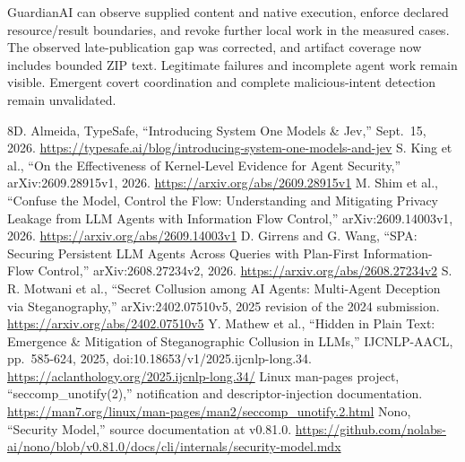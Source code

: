 \documentclass[conference]{IEEEtran}
\begin{document}
GuardianAI can observe supplied content and native execution, enforce declared resource/result boundaries, and revoke further local work in the measured cases. The observed late-publication gap was corrected, and artifact coverage now includes bounded ZIP text. Legitimate failures and incomplete agent work remain visible. Emergent covert coordination and complete malicious-intent detection remain unvalidated.
\balance\begin{thebibliography}{8}D. Almeida, TypeSafe, ``Introducing System One Models \& Jev,'' Sept.~15, 2026. \url{https://typesafe.ai/blog/introducing-system-one-models-and-jev}
S. King et al., ``On the Effectiveness of Kernel-Level Evidence for Agent Security,'' arXiv:2609.28915v1, 2026. \url{https://arxiv.org/abs/2609.28915v1}
M. Shim et al., ``Confuse the Model, Control the Flow: Understanding and Mitigating Privacy Leakage from LLM Agents with Information Flow Control,'' arXiv:2609.14003v1, 2026. \url{https://arxiv.org/abs/2609.14003v1}
D. Girrens and G. Wang, ``SPA: Securing Persistent LLM Agents Across Queries with Plan-First Information-Flow Control,'' arXiv:2608.27234v2, 2026. \url{https://arxiv.org/abs/2608.27234v2}
S. R. Motwani et al., ``Secret Collusion among AI Agents: Multi-Agent Deception via Steganography,'' arXiv:2402.07510v5, 2025 revision of the 2024 submission. \url{https://arxiv.org/abs/2402.07510v5}
Y. Mathew et al., ``Hidden in Plain Text: Emergence \& Mitigation of Steganographic Collusion in LLMs,'' IJCNLP-AACL, pp.~585-624, 2025, doi:10.18653/v1/2025.ijcnlp-long.34. \url{https://aclanthology.org/2025.ijcnlp-long.34/}
Linux man-pages project, ``seccomp\_unotify(2),'' notification and descriptor-injection documentation. \url{https://man7.org/linux/man-pages/man2/seccomp_unotify.2.html}
Nono, ``Security Model,'' source documentation at v0.81.0. \url{https://github.com/nolabs-ai/nono/blob/v0.81.0/docs/cli/internals/security-model.mdx}\end{thebibliography}
\end{document}
